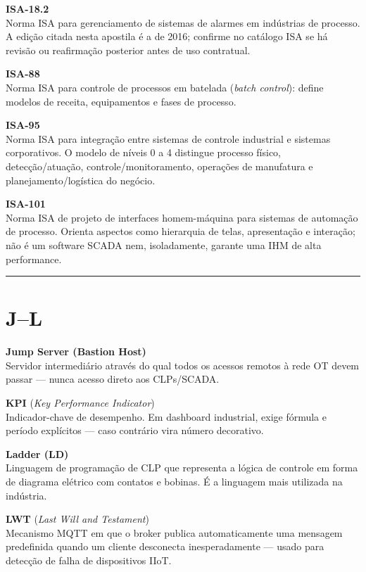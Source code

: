 \textbf{ISA-18.2}\\
Norma ISA para gerenciamento de sistemas de alarmes em indústrias de processo. A edição citada nesta apostila é a de 2016; confirme no catálogo ISA se há revisão ou reafirmação posterior antes de uso contratual.

\textbf{ISA-88}\\
Norma ISA para controle de processos em batelada (\emph{batch control}): define modelos de receita, equipamentos e fases de processo.

\textbf{ISA-95}\\
Norma ISA para integração entre sistemas de controle industrial e sistemas corporativos. O modelo de níveis 0 a 4 distingue processo físico, detecção/atuação, controle/monitoramento, operações de manufatura e planejamento/logística do negócio.

\textbf{ISA-101}\\
Norma ISA de projeto de interfaces homem-máquina para sistemas de automação de processo. Orienta aspectos como hierarquia de telas, apresentação e interação; não é um software SCADA nem, isoladamente, garante uma IHM de alta performance.

\begin{center}\rule{0.5\linewidth}{0.5pt}\end{center}

\section{\texorpdfstring{J--L}{JL}}\label{jl}

\textbf{Jump Server (Bastion Host)}\\
Servidor intermediário através do qual todos os acessos remotos à rede OT devem passar --- nunca acesso direto aos CLPs/SCADA.

\textbf{KPI} (\emph{Key Performance Indicator})\\
Indicador-chave de desempenho. Em dashboard industrial, exige fórmula e período explícitos --- caso contrário vira número decorativo.

\textbf{Ladder (LD)}\\
Linguagem de programação de CLP que representa a lógica de controle em forma de diagrama elétrico com contatos e bobinas. É a linguagem mais utilizada na indústria.

\textbf{LWT} (\emph{Last Will and Testament})\\
Mecanismo MQTT em que o broker publica automaticamente uma mensagem predefinida quando um cliente desconecta inesperadamente --- usado para detecção de falha de dispositivos IIoT.

